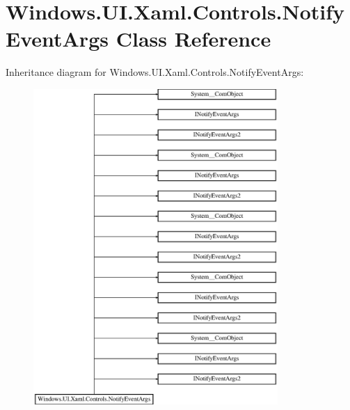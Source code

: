 \hypertarget{class_windows_1_1_u_i_1_1_xaml_1_1_controls_1_1_notify_event_args}{}\section{Windows.\+U\+I.\+Xaml.\+Controls.\+Notify\+Event\+Args Class Reference}
\label{class_windows_1_1_u_i_1_1_xaml_1_1_controls_1_1_notify_event_args}
Inheritance diagram for Windows.\+U\+I.\+Xaml.\+Controls.\+Notify\+Event\+Args\+:\begin{figure}[H]
\begin{center}
\leavevmode
\includegraphics[height=12.000000cm]{class_windows_1_1_u_i_1_1_xaml_1_1_controls_1_1_notify_event_args}
\end{center}
\end{figure}
